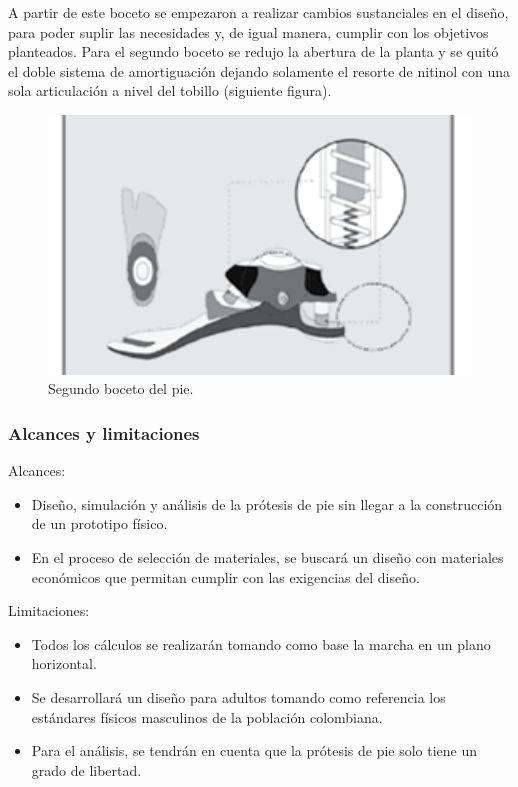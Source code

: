 \documentclass{article}
\begin{document}
A partir de este boceto se empezaron a realizar cambios sustanciales en el diseño, para poder suplir las necesidades y, de igual manera, cumplir con los objetivos planteados. Para el segundo boceto se redujo la abertura de la planta y se quitó el doble sistema de amortiguación dejando solamente el resorte de nitinol con una sola articulación a nivel del tobillo (siguiente figura).
\begin{figure}[htp] %
    \centering
    \includegraphics[width=150mm]{boceto 2.png} %
    \caption{Segundo boceto del pie.}
    \label{grafica}
\end{figure}
\subsubsection{Alcances y limitaciones} 
Alcances:
\begin{itemize}
    \item Diseño, simulación y análisis de la prótesis de pie sin llegar a la construcción de un prototipo físico.
    \item En el proceso de selección de materiales, se buscará un diseño con materiales económicos que permitan cumplir con las exigencias del diseño.
    \end{itemize}
Limitaciones:  
\begin{itemize}
    \item Todos los cálculos se realizarán tomando como base la marcha en un plano horizontal.
    \item Se desarrollará un diseño para adultos tomando como referencia los estándares físicos masculinos de la población colombiana.
    \item 	Para el análisis, se tendrán en cuenta que la prótesis de pie solo tiene un grado de libertad. 
\end{itemize}
\newpage
\end{document}
